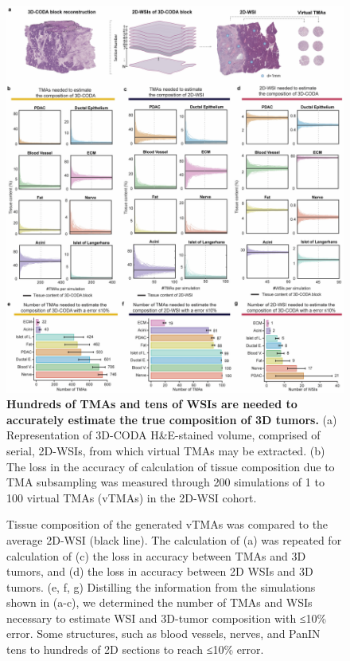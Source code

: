 \begin{refsection}
    \begin{figure}[p]
        \begin{center}
            \includegraphics[width=1\textwidth,height=0.9\textheight,keepaspectratio,clip,page=1]{figures/chapter2/PDAC_Fig_4.jpg}
            \captionsetup{font=small}
            \caption{\textbf{Hundreds of TMAs and tens of WSIs are needed to accurately estimate the true composition of 3D tumors.} (a) Representation of 3D-CODA H\&E-stained volume, comprised of serial, 2D-WSIs, from which virtual TMAs may be extracted. (b) The loss in the accuracy of calculation of tissue composition due to TMA subsampling was measured through 200 simulations of 1 to 100 virtual TMAs (vTMAs) in the 2D-WSI cohort.}
            \label{chapter2_fig4}
        \end{center}
    \end{figure}
    
    \begin{figure}[h!]
        \ContinuedFloat
        \captionsetup{font=small}
        \caption[]{Tissue composition of the generated vTMAs was compared to the average 2D-WSI (black line). The calculation of (a) was repeated for calculation of (c) the loss in accuracy between TMAs and 3D tumors, and (d) the loss in accuracy between 2D WSIs and 3D tumors. (e, f, g) Distilling the information from the simulations shown in (a-c), we determined the number of TMAs and WSIs necessary to estimate WSI and 3D-tumor composition with ≤10\% error. Some structures, such as blood vessels, nerves, and PanIN tens to hundreds of 2D sections to reach ≤10\% error.}
    \end{figure}


\end{refsection}

